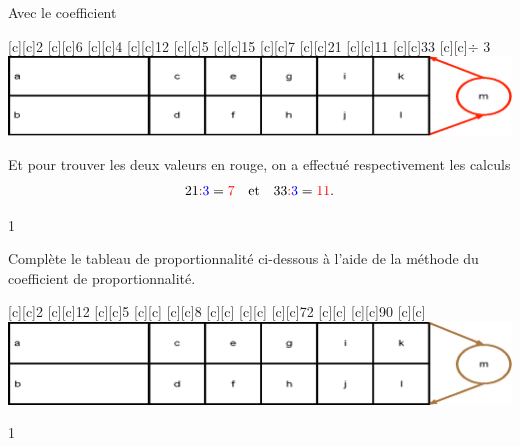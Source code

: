 \documentclass[a4paper,11pt]{report}
\begin{document}
\begin{resolu}{Avec le coefficient}
{{\vspace{-0.5cm}
\begin{center}
[c][c]{2}
[c][c]{6}
[c][c]{4}
[c][c]{\color{brown}12}
[c][c]{5}
[c][c]{\color{brown}15}
[c][c]{\color{red}7}
[c][c]{21}
[c][c]{\color{red}11}
[c][c]{33}
[c][c]{{\Large\color{red}$\div$} {\color{blue}3}}
\includegraphics[scale=.9]{media/fa-30/tableaucoeff2n.eps}
\end{center}
Et pour trouver les deux valeurs en rouge, on  a effectué respectivement les calculs $$21 {\color{red}\div} {\color{blue} 3} = {\color{red} 7} \quad\mbox{et}\quad 33 {\color{red}\div} {\color{blue} 3} = {\color{red} 11} .$$
}}{1}
\end{resolu}


\begin{exop}{
Complète le tableau de proportionnalité ci-dessous à l'aide de la méthode du coefficient de proportionnalité.
 
\vspace{-0.8cm}
\begin{center}
[c][c]{2}
[c][c]{12}
[c][c]{5}
[c][c]{}
[c][c]{8}
[c][c]{}
[c][c]{}
[c][c]{72}
[c][c]{}
[c][c]{90}
[c][c]{\Large\color{brown}{$\cdot \qquad$}}
\includegraphics[scale=.9]{media/fa-30/tableaucoeffn.eps}
\end{center}
\vspace{-0.5cm}}{1}
\end{exop}
\end{document}
